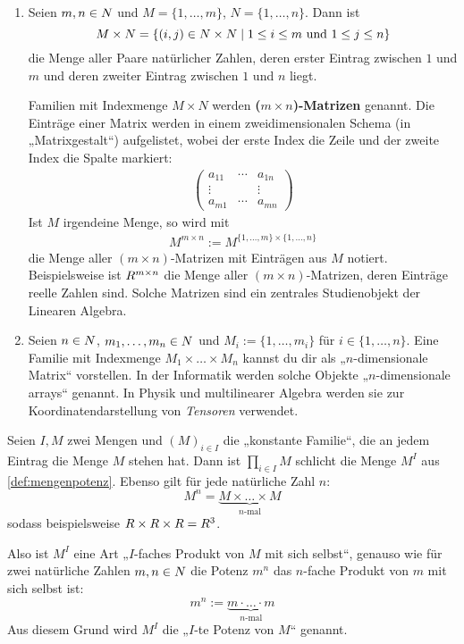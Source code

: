 \begin{bsp} \label{bsp:matrizen}  \quad
    \begin{enumerate}
        \item Seien $m,n\in \relax N$ und $M=\{1,\dots , m\}$, $N=\{1,\dots,n\}$. Dann ist
            \[ M\times N = \{ (i,j) \in \relax N\times \relax N \mid 1\le i\le m \ \text{und}\ 1\le j \le n \} \]
        die Menge aller Paare natürlicher Zahlen, deren erster Eintrag zwischen $1$ und $m$ und deren zweiter Eintrag zwischen $1$ und $n$ liegt.

        Familien mit Indexmenge $M\times N$ werden \textbf{($m\times n$)-Matrizen} genannt. Die Einträge einer Matrix werden in einem zweidimensionalen Schema (in „Matrixgestalt“) aufgelistet, wobei der erste Index die Zeile und der zweite Index die Spalte markiert:
        \begin{align*}
            \begin{pmatrix}
                a_{11} & \cdots & a_{1n} \\
                \vdots && \vdots \\
                a_{m1} & \cdots & a_{mn}
            \end{pmatrix}
        \end{align*}
        Ist $M$ irgendeine Menge, so wird mit
        \begin{align*}
            M^{m\times n} := M^{\{1,\dots , m\}\times \{1,\dots , n\}}
        \end{align*}
        die Menge aller $(m\times n)$-Matrizen mit Einträgen aus $M$ notiert. Beispielsweise ist $\relax R^{m\times n}$ die Menge aller $(m\times n)$-Matrizen, deren Einträge reelle Zahlen sind. Solche Matrizen sind ein zentrales Studienobjekt der Linearen Algebra.
        \item Seien $n\in \relax N$, $m_1,\dots , m_n\in \relax N$ und $M_i:=\{1,\dots , m_i\}$ für $i\in \{1,\dots , n\}$. Eine Familie mit Indexmenge $M_1\times\ldots\times M_n$ kannst du dir als „$n$-dimensionale Matrix“ vorstellen. In der Informatik werden solche Objekte „$n$-dimensionale arrays“ genannt. In Physik und multilinearer Algebra werden sie zur Koordinatendarstellung von \emph{Tensoren} verwendet.
    \end{enumerate}
\end{bsp}


\begin{bem}
    Seien $I,M$ zwei Mengen und $(M)_{i\in I}$ die „konstante Familie“, die an jedem Eintrag die Menge $M$ stehen hat. Dann ist $\prod_{i\in I} M$ schlicht die Menge $M^I$ aus \cref{def:mengenpotenz}. Ebenso gilt für jede natürliche Zahl $n$:
        \[ M^n = \underbrace{M\times\ldots\times M}_{\text{$n$-mal}} \]
    sodass beispielsweise $\relax R\times \relax R\times \relax R= \relax R^3$.

    Also ist $M^I$ eine Art „$I$-faches Produkt von $M$ mit sich selbst“, genauso wie für zwei natürliche Zahlen $m,n\in \relax N$ die Potenz $m^n$ das $n$-fache Produkt von $m$ mit sich selbst ist:
        \[ m^n := \underbrace{m\cdot\ldots\cdot m}_{\text{$n$-mal}}\]
    Aus diesem Grund wird $M^I$ die „$I$-te Potenz von $M$“ genannt.
\end{bem}


